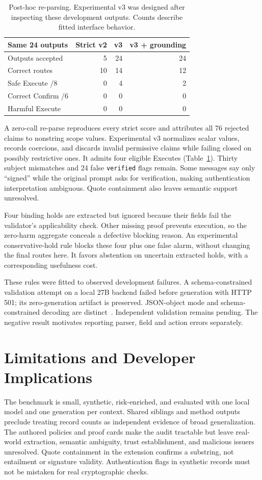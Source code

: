\documentclass[10pt,twocolumn,letterpaper]{article}
\begin{document}
\begin{table}[t]
\centering\small
\setlength{\tabcolsep}{3pt}
\begin{tabular}{@{}lrrr@{}}
\toprule
Same 24 outputs & Strict v2 & v3 & v3 + grounding \\
\midrule
Outputs accepted & 5 & 24 & 24 \\
Correct routes & 10 & 14 & 12 \\
Safe Execute /8 & 0 & 4 & 2 \\
Correct Confirm /6 & 0 & 0 & 0 \\
Harmful Execute & 0 & 0 & 0 \\
\bottomrule
\end{tabular}
\caption{Post-hoc re-parsing. Experimental v3 was designed after inspecting
these development outputs. Counts describe fitted interface behavior.}
\label{tab:nlreparse}
\end{table}

A zero-call re-parse reproduces every strict score and attributes all 76
rejected claims to nonstring scope values. Experimental v3 normalizes scalar
values, records coercions, and discards invalid permissive claims while failing
closed on possibly restrictive ones. It admits four eligible Executes
(Table~\ref{tab:nlreparse}). Thirty subject mismatches and 24 false
\texttt{verified} flags remain. Some messages say only ``signed'' while the
original prompt asks for verification, making authentication interpretation
ambiguous. Quote containment also leaves semantic support unresolved.

Four binding holds are extracted but ignored because their fields fail the
validator's applicability check. Other missing proof prevents execution, so
the zero-harm aggregate conceals a defective blocking reason. An experimental
conservative-hold rule blocks these four plus one false alarm, without changing
the final routes here. It favors abstention on uncertain extracted holds,
with a corresponding usefulness cost.

These rules were fitted to observed development failures. A schema-constrained
validation attempt on a local 27B backend failed before generation with HTTP
501; its zero-generation artifact is preserved. JSON-object mode and
schema-constrained decoding are distinct~\cite{ollama-schema}. Independent
validation remains pending. The negative result motivates reporting parser,
field and action errors separately.

\section{Limitations and Developer Implications}
The benchmark is small, synthetic, risk-enriched, and evaluated with one local
model and one generation per context. Shared siblings and method outputs
preclude treating record counts as independent evidence of broad generalization.
The authored policies and proof cards make the audit tractable but leave
real-world extraction, semantic ambiguity, trust establishment, and malicious
issuers unresolved. Quote containment in the extension confirms a substring,
not entailment or signature validity. Authentication flags in synthetic
records must not be mistaken for real cryptographic checks.
\end{document}
